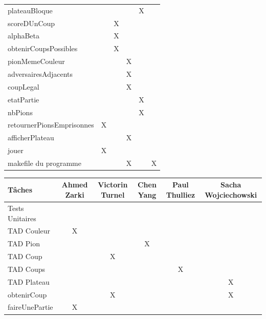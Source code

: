 \documentclass{article}
\begin{document}
\begin{tabular}{|l|c|c|c|c|c|}
  plateauBloque & & & & X & \\
  scoreDUnCoup & & X & & & \\
  alphaBeta & & X & & & \\
  obtenirCoupsPossibles & & X & & & \\
  pionMemeCouleur & & & X & & \\
  adversairesAdjacents & & & X & & \\
  coupLegal & & & X & & \\
  etatPartie & & & & X & \\
  nbPions & & & & X & \\
  retournerPionsEmprisonnes & X & & & & \\
  afficherPlateau & & & X & & \\
  jouer & X & & & & \\
  makefile du programme & & & X & & X \\
  \hline
 \end{tabular}   
 \vspace{3cm}
 \begin{tabular}{|l|c|c|c|c|c|}
   \hline
   Tâches & Ahmed Zarki & Victorin Turnel & Chen Yang & Paul Thulliez & Sacha Wojciechowski \\
   \hline
   Tests Unitaires\\
   \hline
   TAD Couleur & X & & & & \\                                                                                                                                                                       
   TAD Pion & & & X & & \\                                                                                                                                                                              
   TAD Coup & & X & &  & \\                                                                                                                                                                              
   TAD Coups & & & & X & \\                                                                                                                                                                             
   TAD Plateau & & & & & X \\
   obtenirCoup & & X & & & X \\
   faireUnePartie & X & & & & \\
   \hline
 \end{tabular}             
\end{document}
